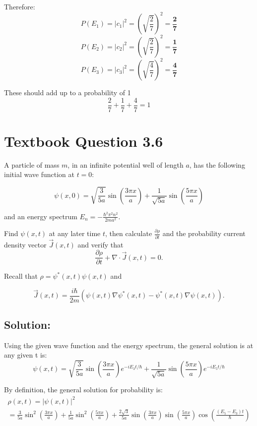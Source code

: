 \documentclass[12pt]{article}
\begin{document}
        Therefore:
        \[
            P(E_1) = |c_1|^2 = \left( \sqrt{\frac{2}{7}} \right)^2 = \boldsymbol{\boxed{\frac{2}{7}}}
        \]
        \[
            P(E_2) = |c_2|^2 = \left( \sqrt{\frac{2}{7}} \right)^2 = \boldsymbol{\boxed{\frac{1}{7}}}
        \]
        \[
            P(E_3) = |c_3|^2 = \left( \sqrt{\frac{4}{7}} \right)^2 = \boldsymbol{\boxed{\frac{4}{7}}}
        \]

        These should add up to a probability of 1
        \[
            \frac{2}{7} + \frac{1}{7} + \frac{4}{7} = 1
        \]

\section{Textbook Question 3.6}

    A particle of mass \( m \), in an infinite potential well of length \( a \), has the following initial wave function at \( t = 0 \):
    
    \[
        \psi(x,0) = \sqrt{\frac{3}{5a}} \sin\left( \frac{3\pi x}{a} \right) + \frac{1}{\sqrt{5a}} \sin\left( \frac{5\pi x}{a} \right)
    \]

    and an energy spectrum \( E_n = -\frac{\hbar^2 \pi^2 n^2}{2ma^2} \).

    Find \( \psi(x,t) \) at any later time \( t \), then calculate \( \frac{\partial \rho}{\partial t} \) and the probability current density vector \( \vec{J}(x,t) \) and verify that 
    \[
        \frac{\partial \rho}{\partial t} + \nabla \cdot \vec{J}(x,t) = 0.
    \]
    
    Recall that \( \rho = \psi^*(x,t)\psi(x,t) \) and
    
    \[
        \vec{J}(x,t) = \frac{i\hbar}{2m} \left( \psi(x,t) \nabla \psi^*(x,t) - \psi^*(x,t) \nabla \psi(x,t) \right).
    \]

    \subsection{Solution:}
        Using the given wave function and the energy spectrum, the general solution is at any given t is:
        \[
            \psi(x, t) = \sqrt{\frac{3}{5a}} \sin\left( \frac{3\pi x}{a} \right) e^{-i E_3 t/\hbar}
            + \frac{1}{\sqrt{5a}} \sin\left( \frac{5\pi x}{a} \right) e^{-i E_5 t/\hbar}
        \]

        By definition, the general solution for probability is:
        \begin{align*}
            \rho(x,t) = |\psi(x,t)|^2 \\
                = \frac{3}{5a} \sin^2\left( \frac{3\pi x}{a} \right)
                + \frac{1}{5a} \sin^2\left( \frac{5\pi x}{a} \right)
                + \frac{2\sqrt{3}}{5a} \sin\left( \frac{3\pi x}{a} \right) \sin\left( \frac{5\pi x}{a} \right) \cos\left( \frac{(E_5 - E_3)t}{\hbar} \right)
        \end{align*}
\end{document}
